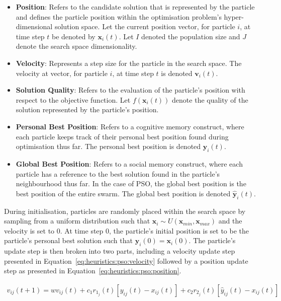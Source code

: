 \begin{itemize}
	\item \textbf{Position}: Refers to the candidate solution that is represented by the particle and defines the particle position within the optimisation problem's hyper-dimensional solution space. Let the current position vector, for particle $i$, at time step $t$ be denoted by $\boldsymbol{x}_{i}(t)$. Let $I$ denoted the population size and $J$ denote the search space dimensionality.

	\item \textbf{Velocity}: Represents a step size for the particle in the search space. The velocity at vector, for particle $i$, at time step $t$ is denoted $\boldsymbol{v}_{i}(t)$.

	\item \textbf{Solution Quality}: Refers to the evaluation of the particle's position with respect to the objective function. Let $f(\boldsymbol{x}_{i}(t))$ denote the quality of the solution represented by the particle's position.

	\item \textbf{Personal Best Position}: Refers to a cognitive memory construct, where each particle keeps track of their personal best position found during optimisation thus far. The personal best position is denoted $\boldsymbol{y}_{i}(t)$.

	\item \textbf{Global Best Position}: Refers to a social memory construct, where each particle has a reference to the best solution found in the particle's neighbourhood thus far. In the case of  \acs{PSO}, the global best position is the best position of the entire swarm. The global best position is denoted $\boldsymbol{\hat{y}}_{i}(t)$.
\end{itemize}

During initialisation, particles are randomly placed within the search space by sampling from a uniform distribution such that $\boldsymbol{x}_{i} \sim U(\boldsymbol{x}_{min}, \boldsymbol{x}_{max})$ and the velocity is set to 0. At time step 0, the particle's initial position is set to be the particle's personal best solution such that $\boldsymbol{y}_{i}(0) = \boldsymbol{x}_{i}(0)$. The particle's update step is then broken into two parts, including a velocity update step presented in Equation~\eqref{eq:heuristics:pso:velocity} followed by a position update step as presented in Equation~\eqref{eq:heuristics:pso:position}.

\begin{equation}
	\label{eq:heuristics:pso:velocity}
	\begin{split}
		v_{ij}(t+1) = wv_{ij}(t) + c_{1}r_{1_{j}}(t)[y_{ij}(t) - x_{ij}(t)] + c_{2}r_{2_{j}}(t)[\hat{y}_{ij}(t) - x_{ij}(t)]
	\end{split}
\end{equation}

